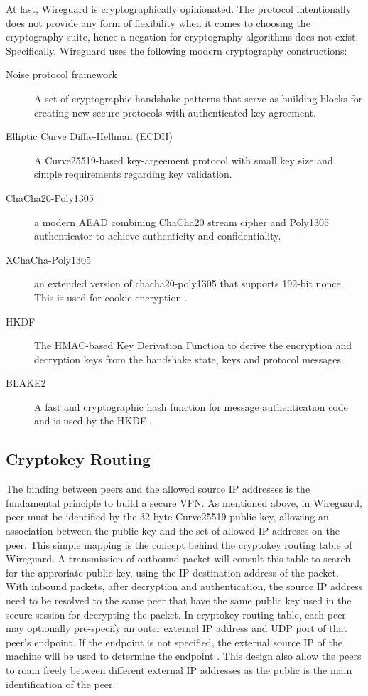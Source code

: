 At last, Wireguard is cryptographically opinionated. The protocol intentionally does not provide 
any form of flexibility when it comes to choosing the cryptography suite, hence a negation for
cryptography algorithms does not exist. Specifically, Wireguard uses the following modern
cryptography constructions:
\begin{description}
  \item[Noise protocol framework]  A set of cryptographic handshake patterns that 
  serve as building blocks for creating new secure protocols with authenticated key agreement.
  \item[Elliptic Curve Diffie-Hellman (ECDH)] A Curve25519-based key-argeement protocol 
  with small key size and simple requirements regarding key validation.
  \item[ChaCha20-Poly1305] a modern AEAD combining ChaCha20 \cite{chacha20} stream cipher 
  and Poly1305 \cite{poly1305} authenticator to achieve authenticity and confidentiality. 
  \item[XChaCha-Poly1305] an extended version of chacha20-poly1305 that supports 192-bit nonce.
  This is used for cookie encryption \cite{irtf-cfrg-xchacha-03}.
  \item[HKDF] The HMAC-based Key Derivation Function \cite{rfc5869} to derive the encryption
  and decryption keys from the handshake state, keys and protocol messages.
  \item[BLAKE2] A fast and cryptographic hash function for message authentication code and is used
  by the HKDF \cite{rfc7693}.

\end{description}

\subsection{Cryptokey Routing}
  The binding between peers and the allowed source IP addresses is the fundamental principle to build 
  a secure VPN. As mentioned above, in Wireguard, peer must be identified by the 32-byte
  Curve25519 public key, allowing an association between the public key and the set
  of allowed IP addreses on the peer. This simple mapping is the concept behind the cryptokey
  routing table of Wireguard. A transmission of outbound packet will consult this table to search
  for the approriate public key, using the IP destination address of the packet. With inbound packets,
  after decryption and authentication, the source IP address need to be resolved to the same 
  peer that have the same public key used in the secure session for decrypting the packet. 
  In cryptokey routing table, each peer may optionally pre-specify an outer external IP address
  and UDP port of that peer's endpoint. If the endpoint is not specified, the external
  source IP of the machine will be used to determine the endpoint .
  This design also allow the peers to roam freely between different external IP addresses as the
  public is the main identification of the peer.
  
